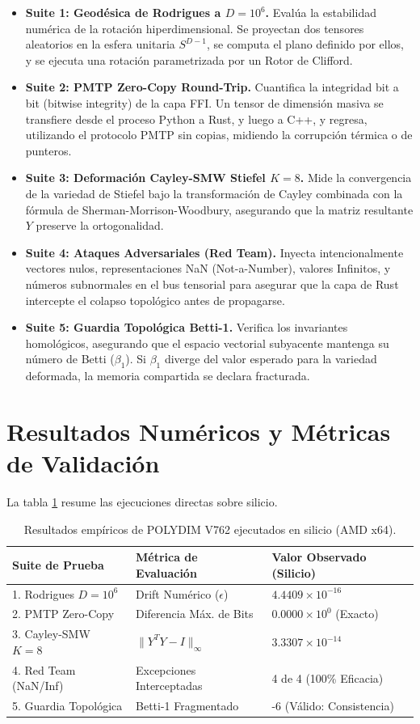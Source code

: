 \begin{itemize}
    \item \textbf{Suite 1: Geodésica de Rodrigues a $D=10^6$.} Evalúa la estabilidad numérica de la rotación hiperdimensional. Se proyectan dos tensores aleatorios en la esfera unitaria $S^{D-1}$, se computa el plano definido por ellos, y se ejecuta una rotación parametrizada por un Rotor de Clifford.
    \item \textbf{Suite 2: PMTP Zero-Copy Round-Trip.} Cuantifica la integridad bit a bit (bitwise integrity) de la capa FFI. Un tensor de dimensión masiva se transfiere desde el proceso Python a Rust, y luego a C++, y regresa, utilizando el protocolo PMTP sin copias, midiendo la corrupción térmica o de punteros.
    \item \textbf{Suite 3: Deformación Cayley-SMW Stiefel $K=8$.} Mide la convergencia de la variedad de Stiefel bajo la transformación de Cayley combinada con la fórmula de Sherman-Morrison-Woodbury, asegurando que la matriz resultante $Y$ preserve la ortogonalidad.
    \item \textbf{Suite 4: Ataques Adversariales (Red Team).} Inyecta intencionalmente vectores nulos, representaciones NaN (Not-a-Number), valores Infinitos, y números subnormales en el bus tensorial para asegurar que la capa de Rust intercepte el colapso topológico antes de propagarse.
    \item \textbf{Suite 5: Guardia Topológica Betti-1.} Verifica los invariantes homológicos, asegurando que el espacio vectorial subyacente mantenga su número de Betti ($\beta_1$). Si $\beta_1$ diverge del valor esperado para la variedad deformada, la memoria compartida se declara fracturada.
\end{itemize}

\section{Resultados Numéricos y Métricas de Validación}
La tabla \ref{tab:resultados_empiricos} resume las ejecuciones directas sobre silicio. 

\begin{table}[h]
\centering
\begin{tabular}{|l|l|l|}
\hline
\textbf{Suite de Prueba} & \textbf{Métrica de Evaluación} & \textbf{Valor Observado (Silicio)} \\ \hline
1. Rodrigues $D=10^6$ & Drift Numérico ($\epsilon$) & $4.4409 \times 10^{-16}$ \\ \hline
2. PMTP Zero-Copy & Diferencia Máx. de Bits & $0.0000 \times 10^0$ (Exacto) \\ \hline
3. Cayley-SMW $K=8$ & $\|Y^T Y - I\|_{\infty}$ & $3.3307 \times 10^{-14}$ \\ \hline
4. Red Team (NaN/Inf) & Excepciones Interceptadas & 4 de 4 (100\% Eficacia) \\ \hline
5. Guardia Topológica & Betti-1 Fragmentado & -6 (Válido: Consistencia) \\ \hline
\end{tabular}
\caption{Resultados empíricos de POLYDIM V762 ejecutados en silicio (AMD x64).}
\label{tab:resultados_empiricos}
\end{table}

